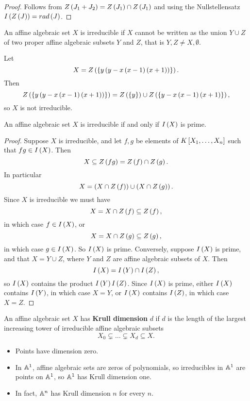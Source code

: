 \begin{proof}
Follows from $ Z\rb{J_1 + J_2} = Z\rb{J_1} \cap Z\rb{J_1} $ and using the Nullstellensatz $ I\rb{Z\rb{J}} = rad\rb{J} $.
\end{proof}

\begin{definition}
An affine algebraic set $ X $ is irreducible if $ X $ cannot be written as the union $ Y \cup Z $ of two proper affine algebraic subsets $ Y $ and $ Z $, that is $ Y, Z \ne X, \emptyset $.
\end{definition}

\begin{example*}
Let
$$ X = Z\rb{\cb{y\rb{y - x\rb{x - 1}\rb{x + 1}}}}. $$
Then
$$ Z\rb{\cb{y\rb{y - x\rb{x - 1}\rb{x + 1}}}} = Z\rb{\cb{y}} \cup Z\rb{\cb{y - x\rb{x - 1}\rb{x + 1}}}, $$
so $ X $ is not irreducible.
\end{example*}

\begin{proposition}
An affine algebraic set $ X $ is irreducible if and only if $ I\rb{X} $ is prime.
\end{proposition}

\begin{proof}
Suppose $ X $ is irreducible, and let $ f, g $ be elements of $ K\sb{X_1, \dots, X_n} $ such that $ fg \in I\rb{X} $. Then
$$ X \subseteq Z\rb{fg} = Z\rb{f} \cap Z\rb{g}. $$
In particular
$$ X = \rb{X \cap Z\rb{f}} \cup \rb{X \cap Z\rb{g}}. $$
Since $ X $ is irreducible we must have
$$ X = X \cap Z\rb{f} \subseteq Z\rb{f}, $$
in which case $ f \in I\rb{X} $, or
$$ X = X \cap Z\rb{g} \subseteq Z\rb{g}, $$
in which case $ g \in I\rb{X} $. So $ I\rb{X} $ is prime. Conversely, suppose $ I\rb{X} $ is prime, and that $ X = Y \cup Z $, where $ Y $ and $ Z $ are affine algebraic subsets of $ X $. Then
$$ I\rb{X} = I\rb{Y} \cap I\rb{Z}, $$
so $ I\rb{X} $ contains the product $ I\rb{Y}I\rb{Z} $. Since $ I\rb{X} $ is prime, either $ I\rb{X} $ contains $ I\rb{Y} $, in which case $ X = Y $, or $ I\rb{X} $ contains $ I\rb{Z} $, in which case $ X = Z $.
\end{proof}

\begin{definition}
An affine algebraic set $ X $ has \textbf{Krull dimension} $ d $ if $ d $ is the length of the largest increasing tower of irreducible affine algebraic subsets
$$ X_0 \subsetneq \dots \subsetneq X_d \subseteq X. $$
\end{definition}

\begin{example*}
\hfill
\begin{itemize}
\item Points have dimension zero.
\item In $ \A^1 $, affine algebraic sets are zeros of polynomials, so irreducibles in $ \A^1 $ are points on $ \A^1 $, so $ \A^1 $ has Krull dimension one.
\item In fact, $ \A^n $ has Krull dimension $ n $ for every $ n $.
\end{itemize}
\end{example*}

